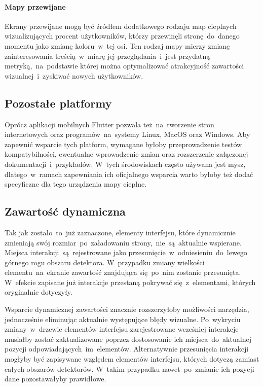 \paragraph{Mapy przewijane} Ekrany przewijane mogą być źródłem dodatkowego rodzaju map cieplnych wizualizujących procent użytkowników, którzy przewinęli stronę~do~danego momentu jako zmianę koloru~w~tej osi. Ten rodzaj mapy mierzy zmianę zainteresowania treścią~w~miarę jej przeglądania~i~jest przydatną metryką,~na~podstawie której można optymalizować atrakcyjność zawartości wizualnej~i~zyskiwać nowych użytkowników.

\subsection{Pozostałe platformy}
Oprócz aplikacji mobilnych Flutter pozwala też~na~tworzenie stron internetowych oraz programów~na~systemy Linux, MacOS oraz Windows. Aby zapewnić wsparcie tych platform, wymagane byłoby przeprowadzenie testów kompatybilności, ewentualne wprowadzenie zmian oraz rozszerzenie załączonej dokumentacji~i~przykładów. W~tych środowiskach często używana jest mysz, dlatego~w~ramach zapewniania ich oficjalnego wsparcia warto byłoby też dodać specyficzne dla tego urządzenia mapy cieplne.

\subsection{Zawartość dynamiczna}
Tak jak zostało~to~już zaznaczone, elementy interfejsu, które dynamicznie zmieniają swój rozmiar~po~załadowaniu strony,~nie~są~aktualnie wspierane. Miejsca interakcji~są~rejestrowane jako przesunięcie~w~odniesieniu~do~lewego górnego rogu obszaru detektora. W~przypadku zmiany wielkości elementu~na~ekranie zawartość znajdująca się~po~nim zostanie przesunięta. W~efekcie zapisane już interakcje przestaną pokrywać się~z~elementami, których oryginalnie dotyczyły. 

Wsparcie dynamicznej zawartości znacznie rozszerzyłoby możliwości narzędzia, jednocześnie eliminując aktualnie występujące błędy wizualne. Po~wykryciu zmiany~w~drzewie elementów interfejsu zarejestrowane wcześniej interakcje musiałby zostać zaktualizowane poprzez dostosowanie ich miejsca~do~aktualnej pozycji odpowiadających~im~elementów. Alternatywnie przesunięcia interakcji mogłyby być zapisywane względem elementów interfejsu, których dotyczą zamiast całych obszarów detektorów. W~takim przypadku nawet~po~zmianie ich pozycji dane pozostawałyby prawidłowe.

